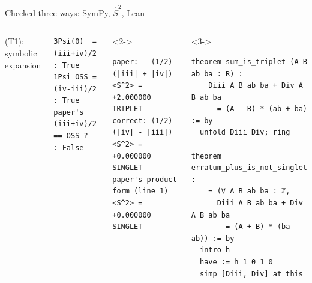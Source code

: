 \begin{frame}[fragile]{Checked three ways: SymPy, $\hat S^2$, Lean}
  \begin{columns}[T]
     (T1): symbolic expansion
\begin{verbatim}
3Psi(0)  = (iii+iv)/2           : True
1Psi_OSS = (iv-iii)/2           : True
paper's (iii+iv)/2 == OSS ?     : False
\end{verbatim}
\begin{onlyenv}<2->
\begin{verbatim}
paper:   (1/2)(|iii| + |iv|)  <S^2> = +2.000000  TRIPLET
correct: (1/2)(|iv| - |iii|)  <S^2> = +0.000000  SINGLET
paper's product form (line 1) <S^2> = +0.000000  SINGLET
\end{verbatim}
\end{onlyenv}
\begin{onlyenv}<3->
\begin{verbatim}
theorem sum_is_triplet (A B ab ba : R) :
    Diii A B ab ba + Div A B ab ba
      = (A - B) * (ab + ba) := by
  unfold Diii Div; ring

theorem erratum_plus_is_not_singlet :
    ¬ (∀ A B ab ba : ℤ,
      Diii A B ab ba + Div A B ab ba
        = (A + B) * (ba - ab)) := by
  intro h
  have := h 1 0 1 0
  simp [Diii, Div] at this
\end{verbatim}
\end{onlyenv}
  \end{columns}
\end{frame}

